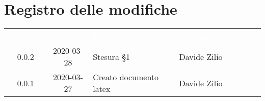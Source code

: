 \section*{Registro delle modifiche}
{
	\centering
	\begin{longtable}{ c c  C{4cm}  c  c }
		\textcolor{white}{\textbf{Versione}} & \textcolor{white}{\textbf{Data}} & \textcolor{white}{\textbf{Descrizione}} & \textcolor{white}{\textbf{Nominativo}} & \textcolor{white}{\textbf{Ruolo}}\\		
		0.0.2 & 2020-03-28 & Stesura \S 1 & Davide Zilio &\reda{} \\
		0.0.1 & 2020-03-27 & Creato documento latex & Davide Zilio &\reda{}\\		
		
	\end{longtable}

}